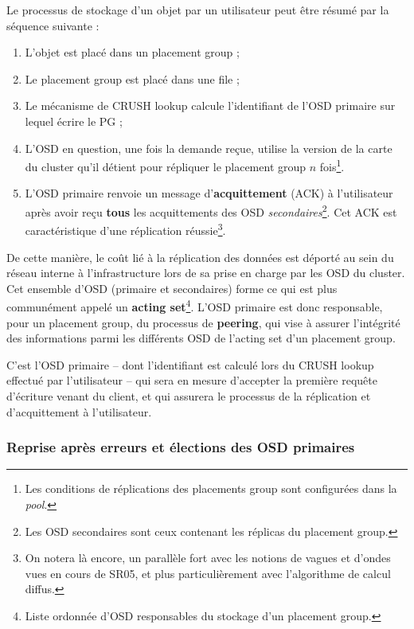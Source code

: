 Le processus de stockage d'un objet par un utilisateur peut être résumé par la séquence suivante :

\begin{enumerate}
	\item L'objet est placé dans un placement group ;
    \item Le placement group est placé dans une file ;
    \item Le mécanisme de CRUSH lookup calcule l'identifiant de l'OSD primaire sur lequel écrire le PG ;
    \item L'OSD en question, une fois la demande reçue, utilise la version de la carte du cluster qu'il détient pour répliquer le placement group $n$ fois\footnote{Les conditions de réplications des placements group sont configurées dans la \emph{pool}.}.
    \item L'OSD primaire renvoie un message d'\textbf{acquittement} (\og{}ACK\fg{}) à l'utilisateur après avoir reçu \textbf{tous} les acquittements des OSD \textit{secondaires}\footnote{Les OSD secondaires sont ceux contenant les réplicas du placement group.}. Cet ACK est caractéristique d'une réplication réussie\footnote{On notera là encore, un parallèle fort avec les notions de vagues et d'ondes vues en cours de SR05, et plus particulièrement avec l'algorithme de calcul diffus.}.
\end{enumerate}

De cette manière, le coût lié à la réplication des données est déporté au sein du réseau interne à l'infrastructure lors de sa prise en charge par les OSD du cluster. Cet ensemble d'OSD (primaire et secondaires) forme ce qui est plus communément appelé un \textbf{acting set}\footnote{Liste ordonnée d'OSD responsables du stockage d'un placement group.}. L'OSD primaire est donc responsable, pour un placement group, du processus de \textbf{peering}, qui vise à assurer l’intégrité des informations parmi les différents OSD de l'acting set d'un placement group. 

\begin{PimpedBox}
C'est l'OSD primaire -- dont l'identifiant est calculé lors du CRUSH lookup effectué par l'utilisateur -- qui sera en mesure d'accepter la première requête d'écriture venant du client, et qui assurera le processus de la réplication et d'acquittement à l'utilisateur.
\end{PimpedBox} 

\subsubsection{Reprise après erreurs et élections des OSD primaires}


